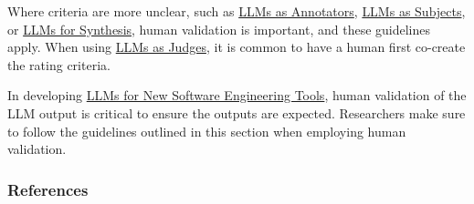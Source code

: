 Where criteria are more unclear, such as \href{/study-types/#llms-as-annotators}{LLMs as Annotators}, \href{/study-types/#llms-as-subjects}{LLMs as Subjects}, or \href{/study-types/#llms-for-synthesis}{LLMs for Synthesis}, human validation is important, and these guidelines apply. When using \href{/study-types/#llms-as-judges}{LLMs as Judges}, it is common to have a human first co-create the rating criteria. 

In developing \href{/study-types/#llms-for-new-software-engineering-tools}{LLMs for New Software Engineering Tools}, human validation of the LLM output is critical to ensure the outputs are expected.
Researchers \should make sure to follow the guidelines outlined in this section when employing human validation.

\subsubsection{References}





